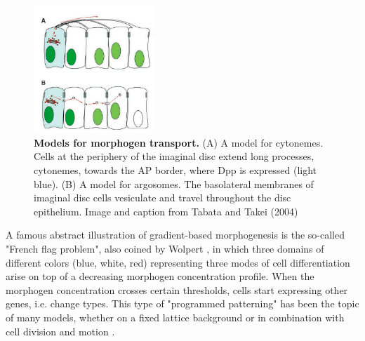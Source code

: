 \begin{figure}
\begin{center}
\includegraphics[width=0.4\textwidth]{../../images/Development_Review/theoretical_model/gradient/tabata_2004.png}
\end{center}
\caption{\textbf{Models for morphogen transport.} (A) A model for cytonemes. Cells at the periphery of the imaginal disc extend long processes, cytonemes, towards the AP border, where Dpp is expressed (light blue). (B) A model for argosomes. The basolateral membranes of imaginal disc cells vesiculate and travel throughout the disc epithelium. Image and caption from Tabata and Takei (2004) \cite{Tabata:2004bp}}
\label{gradient_tabata_2004}
\end{figure}

  A famous abstract illustration of gradient-based morphogenesis is the so-called "French flag problem", also coined by Wolpert \cite{Wolpert:1969wu}, in which three domains of different colors (blue, white, red) representing three modes of cell differentiation arise on top of a decreasing morphogen concentration profile. When the morphogen concentration crosses certain thresholds, cells start expressing other genes, i.e. change types. This type of "programmed patterning" has been the topic of many models, whether on a fixed lattice background or in combination with cell division and motion \cite{Miller:2003uv}\cite{Knabe:2008uk}. 

